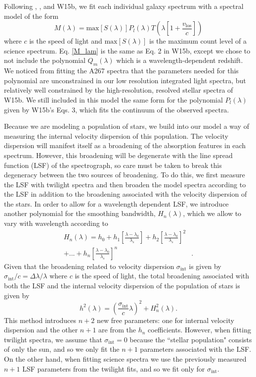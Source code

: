 \documentclass[twocolumn]{aastex6}
\def\disp{\sigma_\mathrm{int}}
\begin{document}
Following \citet{Koleva2009}, \citet{Koposov2011}, and W15b, we fit each individual galaxy spectrum with a spectral model of the form
\begin{equation}
\label{M_lam}
M(\lambda)=\mathrm{max}\left[S\left(\lambda\right)\right]P_l(\lambda)T\left(\lambda\left[1+\frac{v_\mathrm{los}}{c}\right]\right)
\end{equation}
where $c$ is the speed of light and $\mathrm{max}\left[S\left(\lambda\right)\right]$ is the maximum count level of a science spectrum.
Eq. \ref{M_lam} is the same as Eq. 2 in W15b, except we chose to not include the polynomial $Q_m(\lambda)$ which is a wavelength-dependent redshift.
We noticed from fitting the A267 spectra that the parameters needed for this polynomial are unconstrained in our low resolution integrated light spectra, but relatively well constrained by the high-resolution, resolved stellar spectra of W15b.
We still included in this model the same form for the polynomial $P_l(\lambda)$ given by W15b's Eqs. 3, which fits the continuum of the observed spectra.

Because we are modeling a population of stars, we build into our model a way of measuring the internal velocity dispersion of this population.
The velocity dispersion will manifest itself as a broadening of the absorption features in each spectrum.
However, this broadening will be degenerate with the line spread function (LSF) of the spectrograph, so care must be taken to break this degeneracy between the two sources of broadening.
To do this, we first measure the LSF with twilight spectra and then broaden the model spectra according to the LSF in addition to the broadening associated with the velocity dispersion of the stars.
In order to allow for a wavelength dependent LSF, we introduce another polynomial for the smoothing bandwidth, $H_n(\lambda)$, which we allow to vary with wavelength according to
\begin{align}
\label{H_n}
H_n(\lambda)=h_0+h_1\left[\frac{\lambda-\lambda_0}{\lambda_s}\right]+h_2\left[\frac{\lambda-\lambda_0}{\lambda_s}\right]^2&\nonumber\\+...+h_n\left[\frac{\lambda-\lambda_0}{\lambda_s}\right]^n&.
\end{align}
Given that the broadening related to velocity dispersion $\sigma_\mathrm{int}$ is given by $\sigma_\mathrm{int}/c=\Delta\lambda/\lambda$ where $c$ is the speed of light, the total broadening associated with both the LSF and the internal velocity dispersion of the population of stars is given by
\begin{equation}
\label{h_lam}
h^2(\lambda)=\left(\frac{\sigma_\mathrm{int}}{c}\lambda\right)^2+H_n^2(\lambda).
\end{equation}
This method introduces $n+2$ new free parameters: one for internal velocity dispersion and the other $n+1$ are from the $h_n$ coefficients.
However, when fitting twilight spectra, we assume that $\disp=0$ because the ``stellar population" consists of only the sun, and so we only fit the $n+1$ parameters associated with the LSF.
On the other hand, when fitting science spectra we use the previously measured $n+1$ LSF parameters from the twilight fits, and so we fit only for $\disp$.
\end{document}

